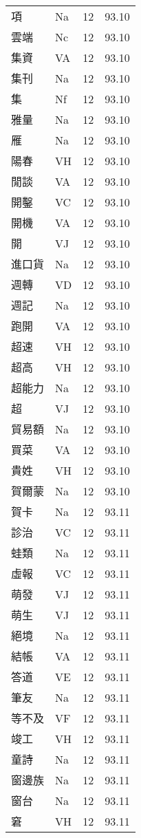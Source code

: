 \documentclass[twocolumn]{book}
\begin{document}
\begin{supertabular}{llrr}
項 & Na & 12 &  93.10\\
雲端 & Nc & 12 &  93.10\\
集資 & VA & 12 &  93.10\\
集刊 & Na & 12 &  93.10\\
集 & Nf & 12 &  93.10\\
雅量 & Na & 12 &  93.10\\
雁 & Na & 12 &  93.10\\
陽春 & VH & 12 &  93.10\\
閒談 & VA & 12 &  93.10\\
開鑿 & VC & 12 &  93.10\\
開機 & VA & 12 &  93.10\\
開 & VJ & 12 &  93.10\\
進口貨 & Na & 12 &  93.10\\
週轉 & VD & 12 &  93.10\\
週記 & Na & 12 &  93.10\\
跑開 & VA & 12 &  93.10\\
超速 & VH & 12 &  93.10\\
超高 & VH & 12 &  93.10\\
超能力 & Na & 12 &  93.10\\
超 & VJ & 12 &  93.10\\
貿易額 & Na & 12 &  93.10\\
買菜 & VA & 12 &  93.10\\
貴姓 & VH & 12 &  93.10\\
賀爾蒙 & Na & 12 &  93.10\\
賀卡 & Na & 12 &  93.11\\
診治 & VC & 12 &  93.11\\
蛙類 & Na & 12 &  93.11\\
虛報 & VC & 12 &  93.11\\
萌發 & VJ & 12 &  93.11\\
萌生 & VJ & 12 &  93.11\\
絕境 & Na & 12 &  93.11\\
結帳 & VA & 12 &  93.11\\
答道 & VE & 12 &  93.11\\
筆友 & Na & 12 &  93.11\\
等不及 & VF & 12 &  93.11\\
竣工 & VH & 12 &  93.11\\
童詩 & Na & 12 &  93.11\\
窗邊族 & Na & 12 &  93.11\\
窗台 & Na & 12 &  93.11\\
窘 & VH & 12 &  93.11\\

\end{supertabular}
\end{document}
